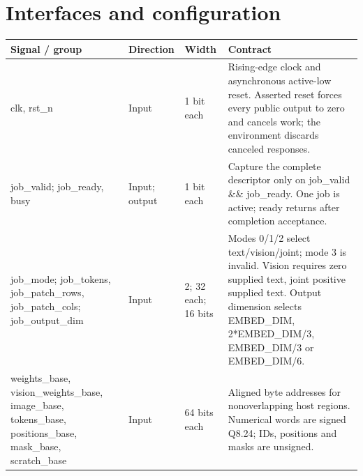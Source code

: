 \documentclass[11pt,a4paper]{article}
\begin{document}
\section{Interfaces and configuration}

{\small\renewcommand{\arraystretch}{1.18}\begin{longtable}{@{}L{0.21\textwidth}|L{0.12\textwidth}|L{0.12\textwidth}|L{0.45\textwidth}@{}}\toprule

\textbf{Signal /\allowbreak{} group} & \textbf{Direction} & \textbf{Width} & \textbf{Contract}\\\midrule\endhead

clk,\allowbreak{} rst\_\allowbreak{}n & Input & 1 bit each & Rising-edge clock and asynchronous active-low reset. Asserted reset forces every public output to zero and cancels work; the environment discards canceled responses.\\[2pt]\hline

job\_\allowbreak{}valid; job\_\allowbreak{}ready,\allowbreak{} busy & Input; output & 1 bit each & Capture the complete descriptor only on job\_\allowbreak{}valid \&\& job\_\allowbreak{}ready. One job is active; ready returns after completion acceptance.\\[2pt]\hline

job\_\allowbreak{}mode; job\_\allowbreak{}tokens,\allowbreak{} job\_\allowbreak{}patch\_\allowbreak{}rows,\allowbreak{} job\_\allowbreak{}patch\_\allowbreak{}cols; job\_\allowbreak{}output\_\allowbreak{}dim & Input & 2; 32 each; 16 bits & Modes 0/\allowbreak{}1/\allowbreak{}2 select text/\allowbreak{}vision/\allowbreak{}joint; mode 3 is invalid. Vision requires zero supplied text,\allowbreak{} joint positive supplied text. Output dimension selects EMBED\_\allowbreak{}DIM,\allowbreak{} 2*\allowbreak{}EMBED\_\allowbreak{}DIM/\allowbreak{}3,\allowbreak{} EMBED\_\allowbreak{}DIM/\allowbreak{}3 or EMBED\_\allowbreak{}DIM/\allowbreak{}6.\\[2pt]\hline

weights\_\allowbreak{}base,\allowbreak{} vision\_\allowbreak{}weights\_\allowbreak{}base,\allowbreak{} image\_\allowbreak{}base,\allowbreak{} tokens\_\allowbreak{}base,\allowbreak{} positions\_\allowbreak{}base,\allowbreak{} mask\_\allowbreak{}base,\allowbreak{} scratch\_\allowbreak{}base & Input & 64 bits each & Aligned byte addresses for nonoverlapping host regions. Numerical words are signed Q8.24; IDs,\allowbreak{} positions and masks are unsigned.\\[2pt]\hline


\end{longtable}}
\end{document}

